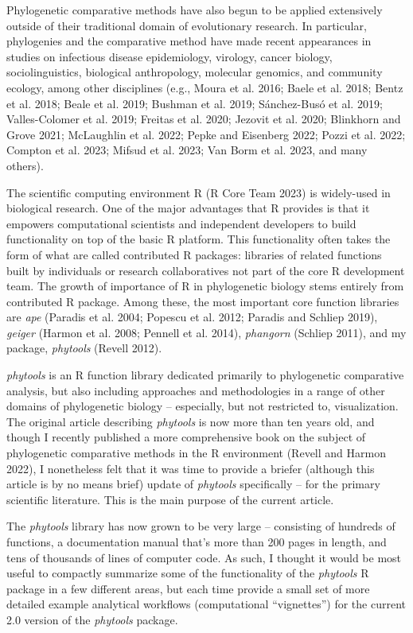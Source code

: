 \documentclass[fleqn,10pt,lineno]{wlpeerj} %
\begin{document}
Phylogenetic comparative methods have also begun to be applied extensively outside of their traditional domain of evolutionary research. In particular, phylogenies and the comparative method have made recent appearances in studies on infectious disease epidemiology, virology, cancer biology, sociolinguistics, biological anthropology, molecular genomics, and community ecology, among other disciplines (e.g., Moura et al. 2016; Baele et al. 2018; Bentz et al. 2018; Beale et al. 2019; Bushman et al. 2019; Sánchez-Busó et al. 2019; Valles-Colomer et al. 2019; Freitas et al. 2020; Jezovit et al. 2020; Blinkhorn and Grove 2021; McLaughlin et al. 2022; Pepke and Eisenberg 2022; Pozzi et al. 2022; Compton et al. 2023; Mifsud et al. 2023; Van Borm et al. 2023, and many others).

The scientific computing environment R (R Core Team 2023) is widely-used in biological research. One of the major advantages that R provides is that it empowers computational scientists and independent developers to build functionality on top of the basic R platform. This functionality often takes the form of what are called contributed R packages: libraries of related functions built by individuals or research collaboratives not part of the core R development team. The growth of importance of R in phylogenetic biology stems entirely from contributed R package. Among these, the most important core function libraries are \emph{ape} (Paradis et al. 2004; Popescu et al. 2012; Paradis and Schliep 2019), \emph{geiger} (Harmon et al. 2008; Pennell et al. 2014), \emph{phangorn} (Schliep 2011), and my package, \emph{phytools} (Revell 2012).

\emph{phytools} is an R function library dedicated primarily to phylogenetic comparative analysis, but also including approaches and methodologies in a range of other domains of phylogenetic biology -- especially, but not restricted to, visualization. The original article describing \emph{phytools} is now more than ten years old, and though I recently published a more comprehensive book on the subject of phylogenetic comparative methods in the R environment (Revell and Harmon 2022), I nonetheless felt that it was time to provide a briefer (although this article is by no means brief) update of \emph{phytools} specifically -- for the primary scientific literature. This is the main purpose of the current article.

The \emph{phytools} library has now grown to be very large -- consisting of hundreds of functions, a documentation manual that's more than 200 pages in length, and tens of thousands of lines of computer code. As such, I thought it would be most useful to compactly summarize some of the functionality of the \emph{phytools} R package in a few different areas, but each time provide a small set of more detailed example analytical workflows (computational ``vignettes'') for the current 2.0 version of the \emph{phytools} package.
\end{document}
